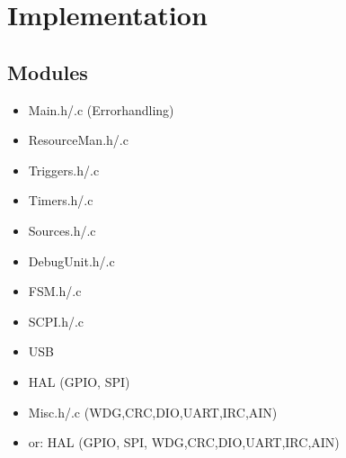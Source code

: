 \section{Implementation}	
\subsection{Modules}	
	
	\begin{itemize} \setlength\itemsep{1px}
		\item Main.h/.c (Errorhandling)
		\item ResourceMan.h/.c
		\item Triggers.h/.c
		\item Timers.h/.c
		\item Sources.h/.c
		\item DebugUnit.h/.c
		\item FSM.h/.c
		\item SCPI.h/.c
		\item USB
		\item HAL (GPIO, SPI)
		\item Misc.h/.c	(WDG,CRC,DIO,UART,IRC,AIN)
		\item or: HAL (GPIO, SPI, WDG,CRC,DIO,UART,IRC,AIN)
	\end{itemize}
